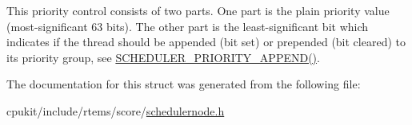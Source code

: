 This priority control consists of two parts. One part is the plain priority value (most-\/significant 63 bits). The other part is the least-\/significant bit which indicates if the thread should be appended (bit set) or prepended (bit cleared) to its priority group, see \mbox{\hyperlink{group__RTEMSScoreScheduler_ga2bc5f17fd4204768543893a50c09bd26}{S\+C\+H\+E\+D\+U\+L\+E\+R\+\_\+\+P\+R\+I\+O\+R\+I\+T\+Y\+\_\+\+A\+P\+P\+E\+N\+D()}}. 

The documentation for this struct was generated from the following file\+:\begin{DoxyCompactItemize}
\item 
cpukit/include/rtems/score/\mbox{\hyperlink{schedulernode_8h}{schedulernode.\+h}}\end{DoxyCompactItemize}
